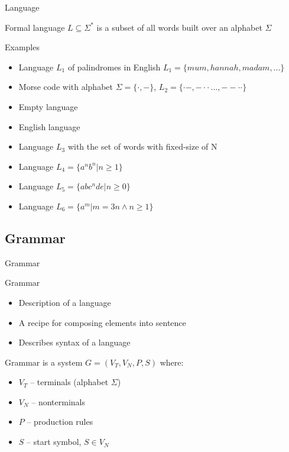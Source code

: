 \documentclass{beamer}
\begin{document}
\begin{frame}{Language}
	
\begin{definition}{Formal language}
$L\subseteq\Sigma^{\ast}$ is a subset of all words built over an alphabet $\Sigma$
\end{definition}
	
\begin{exampleblock}{Examples}
\begin{itemize}
\item Language $L_1$ of palindromes in English $L_1 = \{mum, hannah, madam,...\}$
\item Morse code with alphabet $\Sigma=\{\cdot,	 -\}$, $L_2=\{\cdot -, - \cdot \cdot\,...,--\cdot\cdot\}$
\item Empty language
\item English language
\item Language $L_3$ with the set of words with fixed-size of N
\item Language $L_4 = \{a^nb^n | n \geq 1\}$
\item Language $L_5 = \{abc^nde | n \geq 0\}$
\item Language $L_6 = \{a^m | m = 3n \land n \geq 1\}$
\end{itemize}
\end{exampleblock}
\end{frame}

\subsection{Grammar}

\begin{frame}{Grammar}

\begin{block}{Grammar}
\begin{itemize}
\item Description of a language
\item A recipe for composing elements into sentence
\item Describes syntax of a language
\end{itemize}
\end{block}

\begin{definition}{Grammar}
is a system $G = (V_T, V_N, P, S)$ where:
\begin{itemize}
\item $V_T$ -- terminals (alphabet $\Sigma$)
\item $V_N$ -- nonterminals
\item $P$ -- production rules
\item $S$ -- start symbol, $S\in V_N$
\end{itemize}
\end{definition}

\end{frame}
\end{document}
